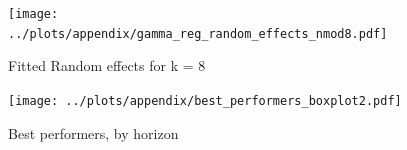 \newpage
\appendix
\renewcommand{\thefigure}{A\arabic{figure}}
\setcounter{figure}{0}
\renewcommand{\thetable}{A\arabic{table}}
\setcounter{table}{0}


\begin{figure}
\centering
\texttt{[image: ../plots/appendix/gamma\_reg\_random\_effects\_nmod8.pdf]}
\caption{Fitted Random effects for k = 8}
\label{fig:replot_nmod8}
\end{figure}

\begin{figure}
\centering
\texttt{[image: ../plots/appendix/best\_performers\_boxplot2.pdf]}
\caption{Best performers, by horizon}
\label{fig:best_performers_by_horizon}
\end{figure}


%
%
%





